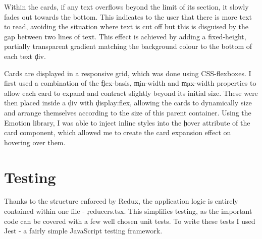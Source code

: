 Within the cards, if any text overflows beyond the limit of its section, it slowly fades out towards the bottom. This indicates to the user that there is more text to read, avoiding the situation where text is cut off but this is disguised by the gap between two lines of text. This effect is achieved by adding a fixed-height, partially transparent gradient matching the background colour to the bottom of each text \c{div}.

Cards are displayed in a responsive grid, which was done using CSS-flexboxes. I first used a combination of the \c{flex-basis}, \c{min-width} and \c{max-width} properties to allow each card to expand and contract slightly beyond its initial size. These were then placed inside a \c{div} with \c{display:flex}, allowing the cards to dynamically size and arrange themselves according to the size of this parent container. Using the Emotion\cite{Emotion} library, I was able to inject inline styles into the \c{hover} attribute of the card component, which allowed me to create the card expansion effect on hovering over them.


\section{Testing}
Thanks to the structure enforced by Redux, the application logic is entirely contained within one file - \c{reducers.tsx}. This simplifies testing, as the important code can be covered with a few well chosen unit tests. To write these tests I used Jest\cite{Jest} - a fairly simple JavaScript testing framework.